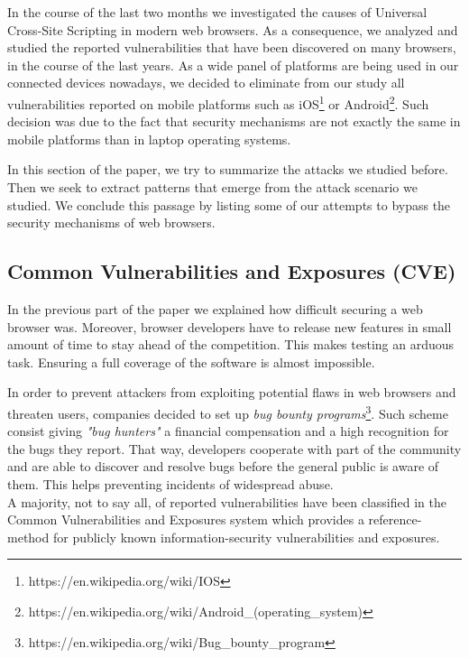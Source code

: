 \documentclass[journal]{IEEEtran}
\begin{document}
In the course of the last two months we investigated the causes of Universal Cross-Site Scripting in modern web browsers. As a consequence, we analyzed and studied the reported vulnerabilities that have been discovered on many browsers, in the course of the last years. 
As a wide panel of platforms are being used in our connected devices nowadays, we decided to eliminate from our study all vulnerabilities reported on mobile platforms such as iOS\footnote{https://en.wikipedia.org/wiki/IOS} or Android\footnote{https://en.wikipedia.org/wiki/Android\_(operating\_system)}. Such decision was due to the fact that security mechanisms are not exactly the same in mobile platforms than in laptop operating systems.

\medskip

In this section of the paper, we try to summarize the attacks we studied before. Then we seek to extract patterns that emerge from the attack scenario we studied. We conclude this passage by listing some of our attempts to bypass the security mechanisms of web browsers.

\subsection{Common Vulnerabilities and Exposures (CVE)}

In the previous part of the paper we explained how difficult securing a web browser was. Moreover, browser developers have to release new features in small amount of time to stay ahead of the competition. This makes testing an arduous task. Ensuring a full coverage of the software is almost impossible.

\medskip

In order to prevent attackers from exploiting potential flaws in web browsers and threaten users, companies decided to set up \emph{bug bounty programs}\footnote{https://en.wikipedia.org/wiki/Bug\_bounty\_program}. Such scheme consist giving \emph{"bug hunters"} a financial compensation and a high recognition for the bugs they report. That way, developers cooperate with part of the community and are able to discover and resolve bugs before the general public is aware of them. This helps preventing incidents of widespread abuse. \\
A majority, not to say all, of reported vulnerabilities have been classified in the Common Vulnerabilities and Exposures system which provides a reference-method for publicly known information-security vulnerabilities and exposures. \\
\end{document}
